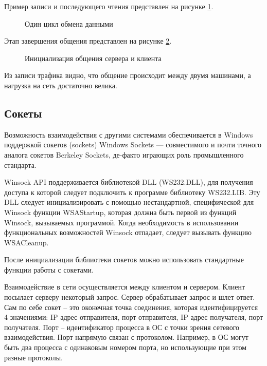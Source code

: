 \documentclass[a4paper]{article}
\begin{document}
	Пример записи и последующего чтения представлен на рисунке \ref{img:wiremsg}.
	\begin{figure}[h!]
		\caption{Один цикл обмена данными}
		\label{img:wiremsg}
	\end{figure}
	
	Этап завершения общения представлен на рисунке \ref{img:wireexit}.
	\begin{figure}[h!]
		\caption{Инициализация общения сервера и клиента}
		\label{img:wireexit}
	\end{figure}
	
	Из записи трафика видно, что общение происходит между двумя машинами, а нагрузка на сеть достаточно велика.
\subsection{Сокеты}
	Возможность взаимодействия с другими системами обеспечивается в Windows поддержкой сокетов (sockets) Windows Sockets — совместимого и почти точного аналога сокетов Berkeley Sockets, де-факто играющих роль промышленного стандарта.
	
	Winsock API поддерживается библиотекой DLL (WS232.DLL), для получения доступа к которой следует подключить к программе библиотеку WS232.LIB. Эту DLL следует инициализировать с помощью нестандартной, специфической для Winsock функции WSAStartup, которая должна быть первой из функций Winsock, вызываемых программой. Когда необходимость в использовании функциональных возможностей Winsock отпадает, следует вызывать функцию WSACleanup.
	
	После инициализации библиотеки сокетов можно использовать стандартные функции работы с сокетами.
	
	Взаимодействие в сети осуществляется между клиентом и сервером. Клиент посылает серверу некоторый запрос. Сервер обрабатывает запрос и шлет ответ. Сам по себе сокет – это оконечная точка соединения, которая идентифицируется 4 значениями: IP адрес отправителя, порт отправителя, IP адрес получателя, порт получателя. Порт – идентификатор процесса в ОС с точки зрения сетевого взаимодействия. Порт напрямую связан с протоколом. Например, в ОС могут быть два процесса с одинаковым номером порта, но использующие при этом разные протоколы.
	
\end{document}

